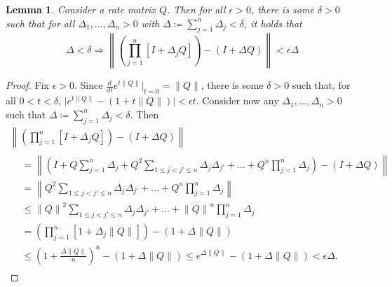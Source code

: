 \documentclass[a4paper,reqno]{amsart}
\newtheorem{lemma}[theorem]{Lemma}
\newcommand{\then}{\Rightarrow}
\begin{document}
\begin{lemma}
Consider a rate matrix $Q$. Then for all $\epsilon>0$, there is some $\delta>0$ such that for all $\Delta_1,\dots,\Delta_n>0$ with $\Delta\coloneqq\sum_{j=1}^n\Delta_j<\delta$, it holds that
\begin{equation*}
\Delta<\delta\then\left\lVert\left(\prod_{j=1}^n[I+\Delta_j Q]\right)-(I+\Delta Q)\right\rVert<\epsilon\Delta
\end{equation*}


\end{lemma}
\begin{proof}
Fix $\epsilon>0$. Since $\frac{d}{dt}e^{t\lVert Q\rVert}\vert_{t=0}=\lVert Q\rVert$, there is some $\delta>0$ such that, for all $0<t<\delta$, $\big\vert e^{t\lVert Q\rVert}- (1+t\lVert Q\rVert)\big\vert<\epsilon t$. Consider now any $\Delta_1,\dots,\Delta_n>0$ such that $\Delta\coloneqq\sum_{j=1}^n\Delta_j<\delta$. Then
\begin{multline*}
\left\lVert\left(\prod_{j=1}^n[I+\Delta_j Q]\right)-(I+\Delta Q)\right\rVert\\
\begin{aligned}
&=
\left\lVert\left(I+Q\sum_{j=1}^n\Delta_j+Q^2\sum_{1\leq j<j'\leq n}\Delta_j\Delta_{j'}+ \dots +Q^n\prod_{j=1}^n\Delta_j\right)-(I+\Delta Q)\right\rVert\\
&=
\left\lVert Q^2\sum_{1\leq j<j'\leq n}\Delta_j\Delta_{j'}+ \dots +Q^n\prod_{j=1}^n\Delta_j \right\rVert\\
&\leq
{\lVert Q\rVert}^2\sum_{1\leq j<j'\leq n}\Delta_j\Delta_{j'}+ \dots +{\lVert Q\rVert}^n\prod_{j=1}^n\Delta_j\\
&=\left(\prod_{j=1}^n[1+\Delta_j\lVert Q\rVert]\right)-(1+\Delta\lVert Q\rVert)\\
&\leq \left(1+\frac{\Delta\lVert Q\rVert}{n}\right)^n-(1+\Delta\lVert Q\rVert)
\leq e^{\Delta\lVert Q\rVert}-(1+\Delta\lVert Q\rVert)
<\epsilon\Delta.
\end{aligned}
\end{multline*}
\end{proof}

 
%
\end{document}

